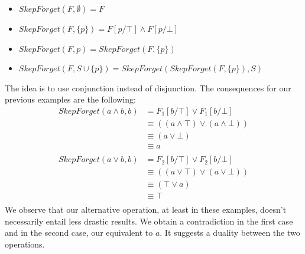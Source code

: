  \begin{itemize}
 \item $\mathit{SkepForget(F,\emptyset)} = F$
 \item $\mathit{SkepForget(F,\{p\})} = F[p/\top] \land F[p/\bot]$
 \item $\mathit{SkepForget}(F,p) = \mathit{SkepForget}(F,\{p\})$
 \item $\mathit{SkepForget(F,S \cup \{p\})} = \mathit{SkepForget(SkepForget(F,\{p\}), S)}$
 \end{itemize}The idea is to use conjunction instead of disjunction. The consequences for our previous examples are the following:\begin{align*}
SkepForget(a \land b,b)&=F_1[b/\top] \lor F_1[b/\bot]\\ &\equiv ((a \land \top) \lor (a \land \bot)) \\
 &\equiv (a \lor \bot) \\
 &\equiv a \\
\end{align*}\begin{align*}
SkepForget(a \lor b,b)&=F_2[b/\top] \lor F_2[b/\bot]\\ &\equiv ((a \lor \top) \lor (a \lor \bot)) \\
 &\equiv (\top \lor a) \\
 &\equiv \top \\
\end{align*}We observe that our alternative operation, at least in these examples, doesn't necessarily entail less drastic results. 
            We obtain a contradiction in the first case and in the second case, our equivalent to $a$. 
            It suggests a duality between the two operations.